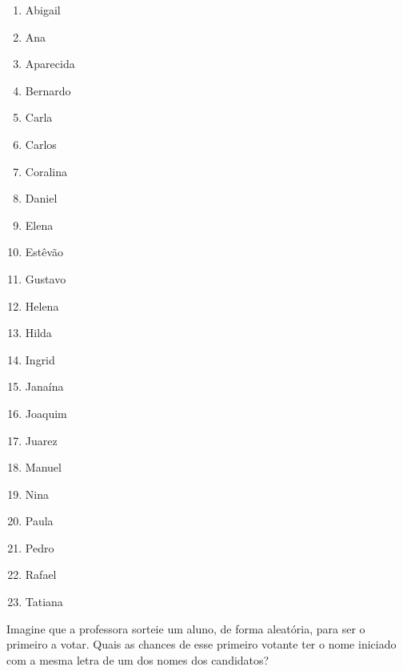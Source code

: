 \begin{myquote}
\begin{multicols}{3}
\begin{enumerate}
\item [] Abigail

\item [] Ana

\item [] Aparecida

\item [] Bernardo

\item [] Carla

\item [] Carlos

\item [] Coralina

\item [] Daniel 

\item [] Elena

\item [] Estêvão

\item [] Gustavo

\item [] Helena

\item [] Hilda

\item [] Ingrid

\item [] Janaína

\item [] Joaquim

\item [] Juarez

\item [] Manuel

\item [] Nina

\item [] Paula

\item [] Pedro

\item [] Rafael

\item [] Tatiana
\end{enumerate}
\end{multicols}
\end{myquote}

Imagine que a professora sorteie um aluno, de forma aleatória, para ser o primeiro a votar. Quais as chances de esse primeiro votante ter o nome iniciado com a mesma letra de um dos nomes dos candidatos?

